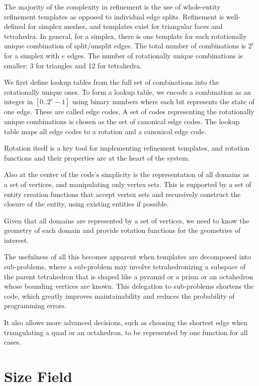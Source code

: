 \documentclass{article}
\begin{document}
The majority of the complexity in refinement is the use of
whole-entity refinement templates as opposed to individual
edge splits.
Refinement is well-defined for simplex meshes, and
templates exist for triangular faces and tetrahedra.
In general, for a simplex, there is one template for
each rotationally unique combination of split/unsplit edges.
The total number of combinations is $2^e$ for a simplex
with $e$ edges.
The number of rotationally unique combinations is smaller:
3 for triangles and 12 for tetrahedra.

We first define lookup tables from the full set of combinations
into the rotationally unique ones.
To form a lookup table, we encode a combination as an integer
in $[0..2^e-1]$ using binary numbers where each bit represents
the state of one edge.
These are called edge codes.
A set of codes representing the rotationally unique combinations
is chosen as the set of canonical edge codes.
The lookup table maps all edge codes to a rotation and a
canonical edge code.

Rotation itself is a key tool for implementing refinement templates,
and rotation functions and their properties are at the heart of
the system.

Also at the center of the code's simplicity is the representation
of all domains as a set of vertices, and manipulating only
vertex sets.
This is supported by a set of entity creation functions that
accept vertex sets and recursively construct the closure
of the entity, using existing entities if possible.

Given that all domains are represented by a set of vertices,
we need to know the geometry of each domain and provide
rotation functions for the geometries of interest.

The usefulness of all this becomes apparent when templates
are decomposed into sub-problems, where a sub-problem may
involve tetrahedronizing a subspace of the parent tetrahedron
that is shaped like a pyramid or a prism or an octahedron
whose bounding vertices are known.
This delegation to sub-problems shortens the code, which
greatly improves maintainability and reduces the probability
of programming errors.

It also allows more advanced decisions, such as choosing
the shortest edge when triangulating a quad or an octahedron,
to be represented by one function for all cases.

\section{Size Field}
\end{document}
